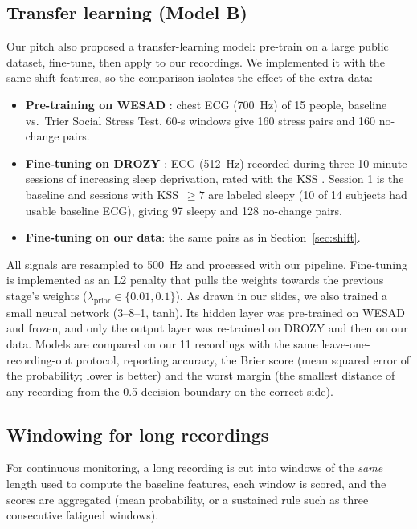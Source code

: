 \documentclass[11pt]{article}
\begin{document}
\subsection{Transfer learning (Model B)}
\label{sec:modelb}
Our pitch also proposed a transfer-learning model: pre-train on a large public dataset, fine-tune, then
apply to our recordings. We implemented it with the same shift features, so the comparison isolates the
effect of the extra data:
\begin{itemize}
  \item \textbf{Pre-training on WESAD} \cite{wesad2018}: chest ECG (700~Hz) of 15 people, baseline vs.\
  Trier Social Stress Test. 60-s windows give 160 stress pairs and 160 no-change pairs.
  \item \textbf{Fine-tuning on DROZY} \cite{drozy2016}: ECG (512~Hz) recorded during three 10-minute sessions
  of increasing sleep deprivation, rated with the KSS \cite{kss1990}. Session 1 is the baseline and sessions with
  KSS~$\geq7$ are labeled sleepy (10 of 14 subjects had usable baseline ECG), giving 97 sleepy and 128 no-change pairs.
  \item \textbf{Fine-tuning on our data}: the same pairs as in Section~\ref{sec:shift}.
\end{itemize}
All signals are resampled to 500~Hz and processed with our pipeline. Fine-tuning is implemented as an L2
penalty that pulls the weights towards the previous stage's weights ($\lambda_{\text{prior}}\in\{0.01,0.1\}$).
As drawn in our slides, we also trained a small neural network (3--8--1, tanh). Its hidden layer was
pre-trained on WESAD and frozen, and only the output layer was re-trained on DROZY and then on our data.
Models are compared on our 11 recordings with the same leave-one-recording-out protocol, reporting accuracy,
the Brier score (mean squared error of the probability; lower is better) and the worst margin (the
smallest distance of any recording from the 0.5 decision boundary on the correct side).

\subsection{Windowing for long recordings}
For continuous monitoring, a long recording is cut into windows of the \emph{same} length used to compute
the baseline features, each window is scored, and the scores are aggregated (mean probability, or a
sustained rule such as three consecutive fatigued windows).
\end{document}
